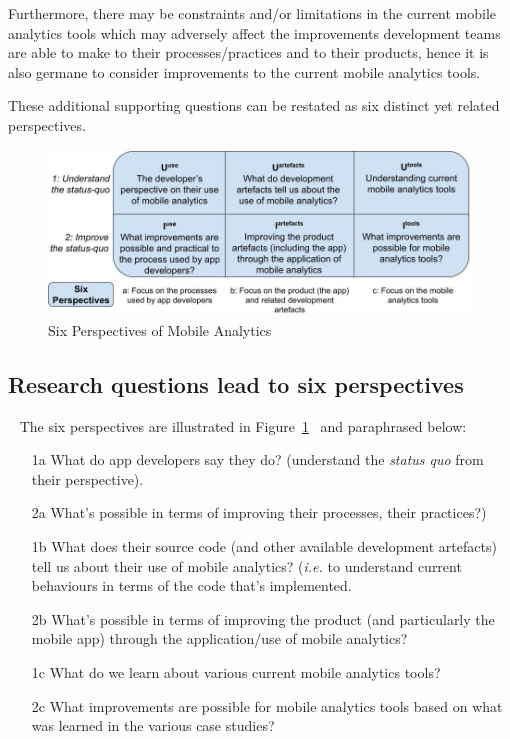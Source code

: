 Furthermore, there may be constraints and/or limitations in the current mobile analytics tools which may adversely affect the improvements development teams are able to make to their processes/practices and to their products, hence it is also germane to consider improvements to the current mobile analytics tools.

These additional supporting questions can be restated as six distinct yet related perspectives.

\begin{figure}
    \includegraphics[width=\linewidth]{images/my/six-perspectives-2x3-matrix-12-nov-2021.jpeg}
    \caption{Six Perspectives of Mobile Analytics}
    \label{fig:six-perspectives-in-the-research-questions-section}
\end{figure}

\subsection{Research questions lead to six perspectives}~\label{rq-leads-to-six-perspectives}
The six perspectives are illustrated in Figure~\ref{fig:six-perspectives-in-the-research-questions-section}~ and paraphrased below:

\begin{enumerate}
    \item [1a] What do app developers say they do? (understand the \emph{status quo} from their perspective).
    \item [2a] What's possible in terms of improving their processes, their practices?)
    \item [1b] What does their source code (and other available development artefacts) tell us about their use of mobile analytics? (\emph{i.e.} to understand current behaviours in terms of the code that's implemented.
    \item [2b] What's possible in terms of improving the product (and particularly the mobile app) through the application/use of mobile analytics?
    \item [1c] What do we learn about various current mobile analytics tools?
    \item [2c] What improvements are possible for mobile analytics tools based on what was learned in the various case studies?
\end{enumerate}


